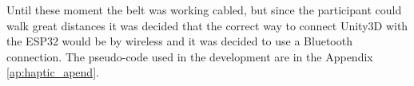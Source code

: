  Until these moment the belt was working cabled, but since the participant could walk great distances it was decided that the correct way to connect Unity3D with the ESP32 would be by wireless and it was decided to use a Bluetooth connection. The pseudo-code used in the development are in the Appendix \ref{ap:haptic_apend}.
